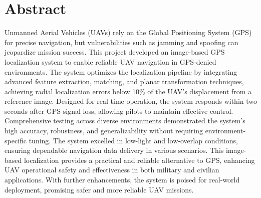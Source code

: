 \chapter*{Abstract}
\makeatletter{}\makeatother




Unmanned Aerial Vehicles (UAVs) rely on the Global Positioning System (GPS) for precise navigation, but vulnerabilities such as jamming and spoofing can jeopardize mission success. This project developed an image-based GPS localization system to enable reliable UAV navigation in GPS-denied environments. The system optimizes the localization pipeline by integrating advanced feature extraction, matching, and planar transformation techniques, achieving radial localization errors below 10\% of the UAV's displacement from a reference image. Designed for real-time operation, the system responds within two seconds after GPS signal loss, allowing pilots to maintain effective control. Comprehensive testing across diverse environments demonstrated the system's high accuracy, robustness, and generalizability without requiring environment-specific tuning. The system excelled in low-light and low-overlap conditions, ensuring dependable navigation data delivery in various scenarios. This image-based localization provides a practical and reliable alternative to GPS, enhancing UAV operational safety and effectiveness in both military and civilian applications. With further enhancements, the system is poised for real-world deployment, promising safer and more reliable UAV missions.








